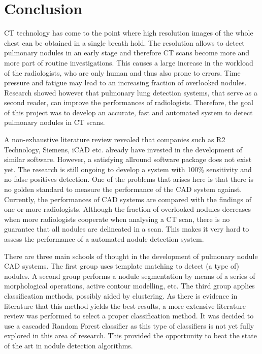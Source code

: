 \section{Conclusion}
CT technology has come to the point where high resolution images of the whole
chest can be obtained in a single breath hold. The resolution allows to detect
pulmonary nodules in an early stage and therefore CT scans become more and more
part of routine investigations. This causes a large increase in the workload of
the radiologists, who are only human and thus also prone to errors. Time
pressure and fatigue may lead to an increasing fraction of overlooked nodules.
Research showed however that pulmonary lung detection systems, that serve as a
second reader, can improve the performances of radiologists.
Therefore, the goal of this project was to develop an accurate, fast and
automated system to detect pulmonary nodules in CT scans.

A non-exhaustive literature review revealed that companies such as R2
Technology, Siemens, iCAD etc. already have invested in the development of
similar software. However, a satisfying allround software package does not exist
yet. The research is still ongoing to develop a system with 100\% sensitivity
and no false positives detection. One of the problems that arises here is that
there is no golden standard to measure the performance of the CAD system
against. Currently, the performances of CAD systems are compared with the
findings of one or more radiologists. Although the fraction of overlooked
nodules decreases when more radiologists cooperate when analysing a CT scan,
there is no guarantee that all nodules are delineated in a scan. This makes it
very hard to assess the performance of a automated nodule detection system.

There are three main schools of thought in the development of pulmonary nodule CAD
systems. The first group uses template matching to detect (a type of) nodules. A
second group performs a nodule segmentation by means of a series of
morphological operations, active contour modelling, etc. The third group applies
classification methods, possibly aided by clustering. As there is evidence
in literature that this method yields the best results, a more extensive
literature review was performed to select a proper classification method. It was
decided to use a cascaded Random Forest classifier as this type of classifiers
is not yet fully explored in this area of research. This provided the
opportunity to beat the state of the art in nodule detection algorithms.

